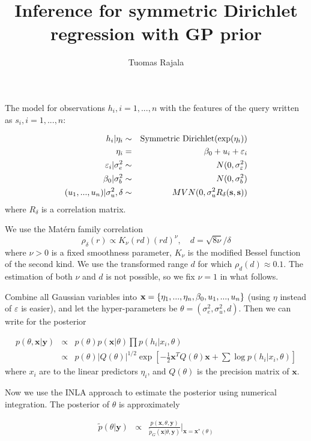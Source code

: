 \documentclass[10pt, onecolumn]{article}
\newcommand{\x}{\mathbf{x}}
\newcommand{\y}{\mathbf{y}}
\begin{document}
\title{Inference for symmetric Dirichlet regression with GP prior}
\author{Tuomas Rajala}
\maketitle

The model for observations $h_i, i=1,...,n$ with the features of the query written as $s_i, i=1, ..., n$:

\begin{eqnarray}
h_i | \eta_i & \sim & \mathrm{Symmetric\ Dirichlet}(\exp(\eta_i))\\
\eta_i &=& \beta_0 + u_i + \varepsilon_i \\
\varepsilon_i|\sigma_e^2  &\sim & N(0, \sigma^2_\varepsilon)\\
\beta_0|\sigma_b^2 &\sim & N(0, \sigma^2_b)\\
(u_1,...,u_n)|\sigma_u^2, \delta  &\sim & MVN(0, \sigma_u^2 R_{\delta}(\bold s, \bold s))
\end{eqnarray}
where $R_\delta$ is a correlation matrix.

We use the Mat\'{e}rn family correlation
\[
\rho_\delta (r) \propto K_\nu(r d) (r d)^\nu, \quad d=\sqrt{8\nu}/\delta
\]
where $\nu>0$ is a fixed smoothness parameter, $K_\nu$ is the modified Bessel function of the second kind. We use the transformed range $d$ for which $\rho_d(d)\approx 0.1$. The estimation of both $\nu$ and $d$ is not possible, so we fix $\nu=1$ in what follows.

Combine all Gaussian variables into $\bold x=\{\eta_1,...,\eta_n, \beta_0, u_1, ..., u_n\}$ (using $\eta$ instead of $\varepsilon$ is easier), and let the hyper-parameters be $\theta=(\sigma_e^2, \sigma_u^2, d)$. Then we can write for the posterior

\begin{eqnarray}
p(\theta, \x | \y ) &\propto& p(\theta)p(\x|\theta) \prod p(h_i|x_i, \theta)\\
&\propto&p(\theta)|Q(\theta)|^{1/2} \exp\left[-\frac{1}{2}\x^T Q(\theta)\x + \sum \log p(h_i|x_i,\theta)\right]
\end{eqnarray}
where $x_i$ are to the linear predictors $\eta_i$, and $Q(\theta)$ is the precision matrix of $\x$. 

Now we use the INLA approach to estimate the posterior using numerical integration. The posterior of $\theta$ is approximately

\begin{eqnarray}
\tilde p(\theta|\y) &\propto & \frac{p(\x, \theta, \y)}{\tilde p_G(\x|\theta, \y)} \Big|_{\x=\x^*(\theta)}
\end{eqnarray}
 
\end{document}
